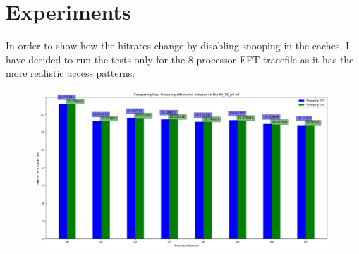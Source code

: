 \documentclass[]{article}
\begin{document}
\section{Experiments}

In order to show how the hitrates change by disabling snooping in the caches, I have decided to run the tests only for the 8 processor FFT tracefile as it has the more realistic access patterns.

\begin{figure}[H]
	\includegraphics[scale=0.35,left]{./snoop.png}
\end{figure}
\end{document}
